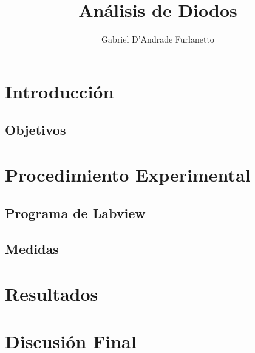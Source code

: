\documentclass[a4paper,12pt]{article}
\begin{document}
\title{Análisis de Diodos}
\author{Gabriel D'Andrade Furlanetto}
\maketitle


\section{Introducción}

\subsection{Objetivos}

\section{Procedimiento Experimental}

\subsection{Programa de Labview}
\subsection{Medidas}

\section{Resultados}

\section{Discusión Final}
\end{document}
